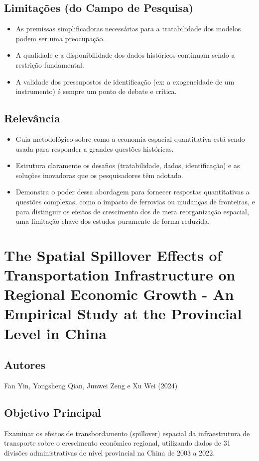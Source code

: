 \documentclass[12pt]{article}
\begin{document}
\subsection*{Limitações (do Campo de Pesquisa)}
\begin{itemize}
    \item As premissas simplificadoras necessárias para a tratabilidade dos modelos podem ser uma preocupação.
    \item A qualidade e a disponibilidade dos dados históricos continuam sendo a restrição fundamental.
    \item A validade dos pressupostos de identificação (ex: a exogeneidade de um instrumento) é sempre um ponto de debate e crítica.
\end{itemize}

\subsection*{Relevância}
\begin{itemize}
    \item Guia metodológico sobre como a economia espacial quantitativa está sendo usada para responder a grandes questões históricas.
    \item Estrutura claramente os desafios (tratabilidade, dados, identificação) e as soluções inovadoras que os pesquisadores têm adotado.
    \item Demonstra o poder dessa abordagem para fornecer respostas quantitativas a questões complexas, como o impacto de ferrovias ou mudanças de fronteiras, e para distinguir os efeitos de crescimento dos de mera reorganização espacial, uma limitação chave dos estudos puramente de forma reduzida.
\end{itemize}

\section{The Spatial Spillover Effects of Transportation Infrastructure on Regional Economic Growth - An Empirical Study at the Provincial Level in China}

\subsection*{Autores}
Fan Yin, Yongsheng Qian, Junwei Zeng e Xu Wei (2024)

\subsection*{Objetivo Principal}
Examinar os efeitos de transbordamento (spillover) espacial da infraestrutura de transporte sobre o crescimento econômico regional, utilizando dados de 31 divisões administrativas de nível provincial na China de 2003 a 2022.
\end{document}
